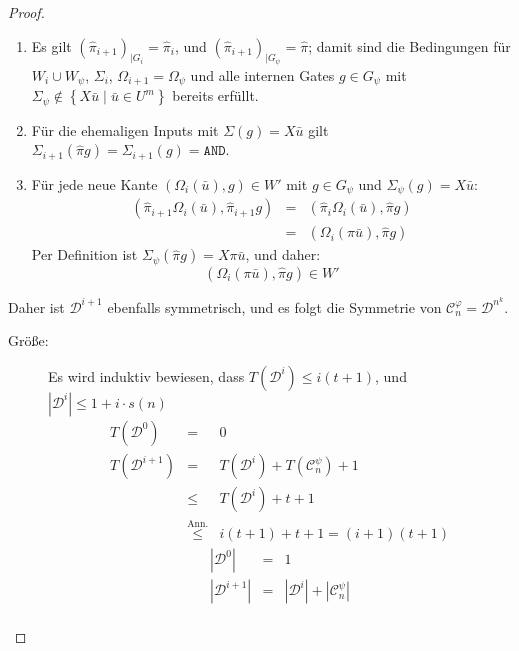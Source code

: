 \begin{proof}
\begin{casenv}
\begin{enumerate}
\item Es gilt $\left(\hat{\pi}_{i+1}\right)_{\mid G_{i}}=\hat{\pi}_{i}$,
und $\left(\hat{\pi}_{i+1}\right)_{\mid G_{\psi}}=\hat{\pi}$; damit
sind die Bedingungen für $W_{i}\cup W_{\psi}$, $\Sigma_{i}$, $\Omega_{i+1}=\Omega_{\psi}$
und alle internen Gates $g\in G_{\psi}$ mit $\Sigma_{\psi}\notin\left\{ X\bar{u}\mid\bar{u}\in U^{m}\right\} $
bereits erfüllt.
\item Für die ehemaligen Inputs mit $\Sigma\left(g\right)=X\bar{u}$ gilt
$\Sigma_{i+1}\left(\hat{\pi}g\right)=\Sigma_{i+1}\left(g\right)=\mathtt{AND}$.
\item Für jede neue Kante $\left(\Omega_{i}\left(\bar{u}\right),g\right)\in W'$
mit $g\in G_{\psi}$ und $\Sigma_{\psi}\left(g\right)=X\bar{u}$:
\begin{eqnarray*}
\left(\hat{\pi}_{i+1}\Omega_{i}\left(\bar{u}\right),\hat{\pi}_{i+1}g\right) & = & \left(\hat{\pi}_{i}\Omega_{i}\left(\bar{u}\right),\hat{\pi}g\right)\\
 & = & \left(\Omega_{i}\left(\pi\bar{u}\right),\hat{\pi}g\right)
\end{eqnarray*}
Per Definition ist $\Sigma_{\psi}\left(\hat{\pi}g\right)=X\pi\bar{u}$,
und daher:
\[
\left(\Omega_{i}\left(\pi\bar{u}\right),\hat{\pi}g\right)\in W'
\]
\end{enumerate}
Daher ist $\mathcal{D}^{i+1}$ ebenfalls symmetrisch, und es folgt
die Symmetrie von $\mathcal{C}_{n}^{\varphi}=\mathcal{D}^{n^{k}}$.
\begin{description}
\item [{Größe:}] Es wird induktiv bewiesen, dass $T\left(\mathcal{D}^{i}\right)\leqslant i\left(t+1\right)$,
und $\left|\mathcal{D}^{i}\right|\leqslant1+i\cdot s\left(n\right)$
\begin{eqnarray*}
T\left(\mathcal{D}^{0}\right) & = & 0\\
T\left(\mathcal{D}^{i+1}\right) & = & T\left(\mathcal{D}^{i}\right)+T\left(\mathcal{C}_{n}^{\psi}\right)+1\\
 & \leqslant & T\left(\mathcal{D}^{i}\right)+t+1\\
 & \overset{\mathrm{Ann.}}{\leqslant} & i\left(t+1\right)+t+1=\left(i+1\right)\left(t+1\right)
\end{eqnarray*}
\begin{eqnarray*}
\left|\mathcal{D}^{0}\right| & = & 1\\
\left|\mathcal{D}^{i+1}\right| & = & \left|\mathcal{D}^{i}\right|+\left|\mathcal{C}_{n}^{\psi}\right|\\

\end{eqnarray*}
\end{description}
\end{casenv}
\end{proof}
